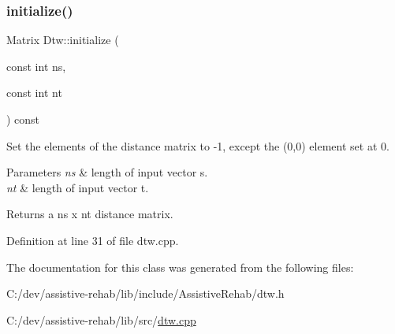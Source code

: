 \mbox{\label{classassistive__rehab_1_1Dtw_a9b3ce7097b8646230f2f9a918126bbef}} 
\subsubsection{\texorpdfstring{initialize()}{initialize()}}
{\footnotesize\ttfamily Matrix Dtw\+::initialize (\begin{DoxyParamCaption}\item[{const int}]{ns,  }\item[{const int}]{nt }\end{DoxyParamCaption}) const\hspace{0.3cm}{\ttfamily [protected]}}



Set the elements of the distance matrix to -\/1, except the (0,0) element set at 0. 


\begin{DoxyParams}{Parameters}
{\em ns} & length of input vector s. \\
\hline
{\em nt} & length of input vector t. \\
\hline
\end{DoxyParams}
\begin{DoxyReturn}{Returns}
a ns x nt distance matrix. 
\end{DoxyReturn}


Definition at line 31 of file dtw.\+cpp.


\begin{DoxyCode}{0}

\end{DoxyCode}


The documentation for this class was generated from the following files\+:\begin{DoxyCompactItemize}
\item 
C\+:/dev/assistive-\/rehab/lib/include/\+Assistive\+Rehab/dtw.\+h\item 
C\+:/dev/assistive-\/rehab/lib/src/\mbox{\hyperlink{dtw_8cpp}{dtw.\+cpp}}\end{DoxyCompactItemize}
